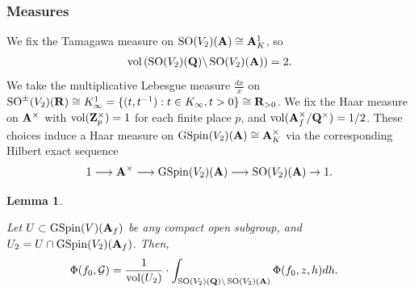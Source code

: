 \documentclass{amsart}
\newtheorem{lemma}[theorem]{Lemma}
\theoremstyle{definition}
\begin{document}
\subsubsection{Measures}

We fix the Tamagawa measure on $\operatorname{SO}(V_2)({\bf{A}}) \cong {\bf{A}}_K^1$, so 
\begin{align*} \operatorname{vol}\left( \operatorname{SO}(V_2)({\bf{Q}}) \backslash \operatorname{SO}(V_2)({\bf{A}}) \right) = 2. \end{align*}
We take the multiplicative Lebesgue measure $\frac{dx}{x}$ on 
$\operatorname{SO}^{\pm}(V_2)({\bf{R}}) \cong K_{\infty}^1 = \lbrace (t, t^{-1}): t \in K_{\infty}, t>0 \rbrace \cong {\bf{R}}_{>0}$. 
We fix the Haar measure on ${\bf{A}}^{\times}$ with $\operatorname{vol}({\bf{Z}}_p^{\times}) = 1$ for each finite place $p$, and $\operatorname{vol}({\bf{A}}_f^{\times}/{\bf{Q}}^{\times}) = 1/2$. 
These choices induce a Haar measure on $\operatorname{GSpin}(V_2)({\bf{A}}) \cong {\bf{A}}_K^{\times}$ via the corresponding Hilbert exact sequence
\begin{align*}1 \longrightarrow {\bf{A}}^{\times} \longrightarrow \operatorname{GSpin}(V_2)({\bf{A}}) 
\longrightarrow \operatorname{SO}(V_2)({\bf{A}}) \rightarrow 1. \end{align*}

\begin{lemma}\label{4.4} 

Let $U \subset \operatorname{GSpin}(V)({\bf{A}}_f)$ be any compact open subgroup, 
and $U_2 = U \cap \operatorname{GSpin}(V_2)({\bf{A}}_f)$. Then,
\begin{align*} \Phi( f_0, \mathcal{G})
&=  \frac{1}{\operatorname{vol}(U_2)} \cdot \int_{ \operatorname{SO}(V_2)({\bf{Q}}) \backslash \operatorname{SO}(V_2)({\bf{A}}) } 
\Phi(f_0, z, h) dh. \end{align*} \end{lemma}
\end{document}
